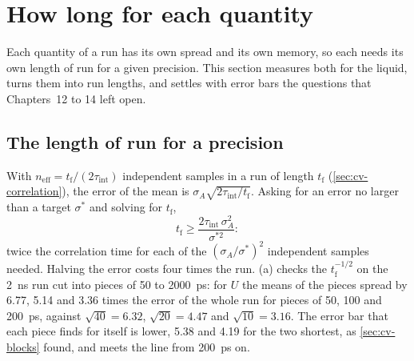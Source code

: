 \section{How long for each quantity}
\label{sec:cv-observables}

Each quantity of a run has its own spread and its own memory, so each
needs its own length of run for a given precision. This section measures
both for the liquid, turns them into run lengths, and settles with error
bars the questions that Chapters~12 to 14 left open.

\subsection*{The length of run for a precision}

With $n_{\mathrm{eff}} = t_{\mathrm f}/(2\tau_{\mathrm{int}})$ independent
samples in a run of length $t_{\mathrm f}$ (\cref{sec:cv-correlation}), the
error of the mean is $\sigma_A\sqrt{2\tau_{\mathrm{int}}/t_{\mathrm f}}$.
Asking for an error no larger than a target $\sigma^\ast$ and solving for
$t_{\mathrm f}$,
\begin{equation}
   t_{\mathrm f} \ge \frac{2\tau_{\mathrm{int}}\,\sigma_A^2}{\sigma^{\ast2}} :
   \label{eq:cv-length}
\end{equation}
twice the correlation time for each of the $(\sigma_A/\sigma^\ast)^2$
independent samples needed. Halving the error costs four times
the run. (a) checks the $t_{\mathrm f}^{-1/2}$ on the
\SI{2}{\nano\second} run cut into pieces of 50 to \SI{2000}{\pico\second}:
for $U$ the means of the pieces spread by 6.77, 5.14 and 3.36 times the
error of the whole run for pieces of 50, 100 and \SI{200}{\pico\second},
against $\sqrt{40} = 6.32$, $\sqrt{20} = 4.47$ and $\sqrt{10} = 3.16$. The
error bar that each piece finds for itself is lower, 5.38 and 4.19 for the
two shortest,
as \cref{sec:cv-blocks} found, and meets the line from
\SI{200}{\pico\second} on.

